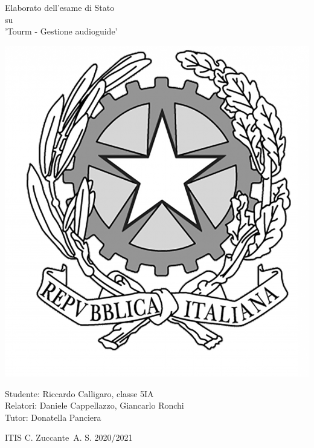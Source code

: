 \documentclass[12pt]{article}
\begin{document}
\begin{titlepage}
    \begin{center}
        \vspace*{1cm}

        \Huge
        Elaborato dell'esame di Stato \\ su \\ 'Tourm - Gestione audioguide'

        \vspace{1.5cm}

        \begin{center}
            \includegraphics[scale=0.08]{images/repubblica.png}
        \end{center}

        \normalsize
        Studente: Riccardo Calligaro, classe 5IA\\
        Relatori: Daniele Cappellazzo, Giancarlo Ronchi\\
        Tutor: Donatella Panciera

        \vfill

        ITIS C. Zuccante\
        A. S. 2020/2021

    \end{center}
\end{titlepage}
\end{document}
